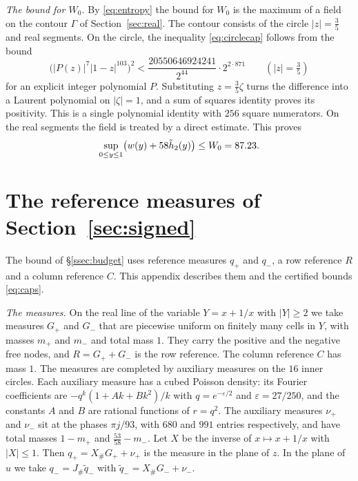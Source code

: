 \emph{The bound for $W_0$.} By \eqref{eq:entropy} the bound for $W_0$ is the maximum of a field on the contour $\Gamma$ of
Section~\ref{sec:real}. The contour consists of the circle $|z|=\frac35$ and real segments. On the circle, the
inequality \eqref{eq:circlecap} follows from the bound
\[
 \bigl(|P(z)|^7|1-z|^{103}\bigr)^2<\frac{20550646924241}{2^{44}}\cdot2^{2\cdot871}\qquad(|z|=\tfrac35)
\]
for an explicit integer polynomial $P$. Substituting $z=\frac35\zeta$ turns the difference into a Laurent polynomial on
$|\zeta|=1$, and a sum of squares identity proves its positivity. This is a single polynomial identity with $256$ square
numerators. On the real segments the field is treated by a direct estimate. This proves
\[
 \sup_{0\le y\le1}\bigl(w(y)+58\tilde h_2(y)\bigr)\le W_0=87.23 .
\]

\section{The reference measures of Section~\ref{sec:signed}}\label{app:trials}

The bound of \S\ref{ssec:budget} uses reference measures $q_+$ and $q_-$, a row reference $R$ and a column reference $C$.
This appendix describes them and the certified bounds \eqref{eq:caps}.

\emph{The measures.} On the real line of the variable $Y=x+1/x$ with $|Y|\ge2$ we take measures $G_+$ and $G_-$ that
are piecewise uniform on finitely many cells in $Y$, with masses $m_+$ and $m_-$ and total mass $1$. They carry the positive and the
negative free nodes, and $R=G_++G_-$ is the row reference. The column reference $C$ has mass $1$. The measures are completed by
auxiliary measures on the $16$ inner circles. Each auxiliary measure has a cubed Poisson density: its Fourier coefficients
are $-q^k(1+Ak+Bk^2)/k$ with $q=e^{-\varepsilon/2}$ and $\varepsilon=27/250$, and the constants $A$ and $B$ are rational functions of $r=q^2$.
The auxiliary measures $\nu_+$ and $\nu_-$ sit at the phases $\pi j/93$, with $680$ and $991$ entries respectively, and have total masses $1-m_+$ and $\frac{53}{58}-m_-$. Let $X$ be the inverse of $x\mapsto x+1/x$ with $|X|\le1$. Then
$q_+=X_\#G_++\nu_+$ is the measure in the plane of $z$. In the plane of $u$ we take $q_-=J_\#\tilde q_-$ with $\tilde q_-=X_\#G_-+\nu_-$.


